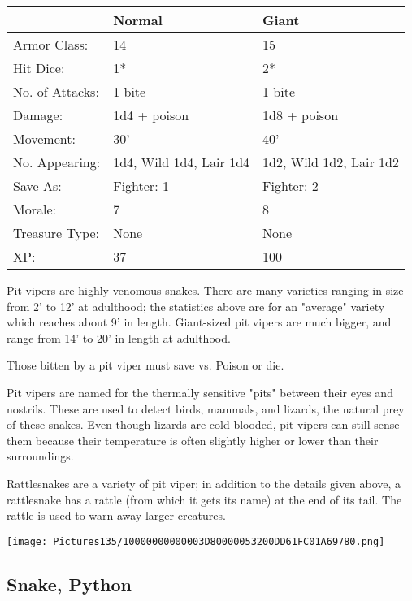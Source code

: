 \documentclass[a4paper,twoside,openany,10pt]{book}
\begin{document}
\begin{multicols}{2}
\begin{tabularx}{0.50\textwidth}{@{}XXX@{}}
& Normal & Giant \\\hline
Armor Class: & 14 & 15 \\\hline
Hit Dice: & 1* & 2* \\\hline
No. of Attacks: & 1 bite & 1 bite \\\hline
Damage: & 1d4 + poison & 1d8 + poison \\\hline
Movement: & 30' & 40' \\\hline
No. Appearing: & 1d4, Wild 1d4, Lair 1d4 & 1d2, Wild 1d2, Lair 1d2 \\\hline
Save As: & Fighter: 1 & Fighter: 2 \\\hline
Morale: & 7 & 8 \\\hline
Treasure Type: & None & None \\\hline
XP: & 37 & 100 \\\hline
\end{tabularx}

Pit vipers are highly venomous snakes. There are many varieties ranging in size from 2' to 12' at adulthood; the statistics above are for an "average" variety which reaches about 9' in length. Giant-sized pit vipers are much bigger, and range from 14' to 20' in length at adulthood.

Those bitten by a pit viper must save vs. Poison or die.

Pit vipers are named for the thermally sensitive "pits" between their eyes and nostrils. These are used to detect birds, mammals, and lizards, the natural prey of these snakes. Even though lizards are cold-blooded, pit vipers can still sense them because their temperature is often slightly higher or lower than their surroundings.

Rattlesnakes are a variety of pit viper; in addition to the details given above, a rattlesnake has a rattle (from which it gets its name) at the end of its tail. The rattle is used to warn away larger creatures. 


\begin{center} \texttt{[image: Pictures135/10000000000003D80000053200DD61FC01A69780.png]} \end{center}


\subsection*{Snake, Python}\label{snake-python}


\end{multicols}
\end{document}
